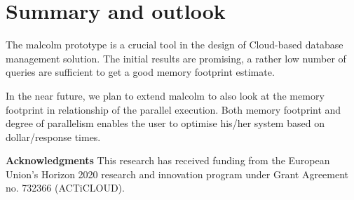 \documentclass[conference]{IEEEtran}
\def\Skip{\par\medskip\nobreak\noindent}
\begin{document}
%

\section{Summary and outlook\label{summary}} 
The {\sc malcolm} prototype is a crucial tool in the design of Cloud-based database management solution.
The initial results are promising, a rather low number of queries are sufficient to get a good memory footprint estimate.

In the near future, we plan to extend {\sc malcolm} to also look at the memory footprint in relationship of the parallel execution.
Both memory footprint and degree of parallelism enables the user to optimise his/her system based on dollar/response times.

\Skip\textbf{Acknowledgments}
This research has received funding from the European Union’s Horizon 2020 research and innovation program under Grant Agreement no. 732366 (ACTiCLOUD).


\end{document}
